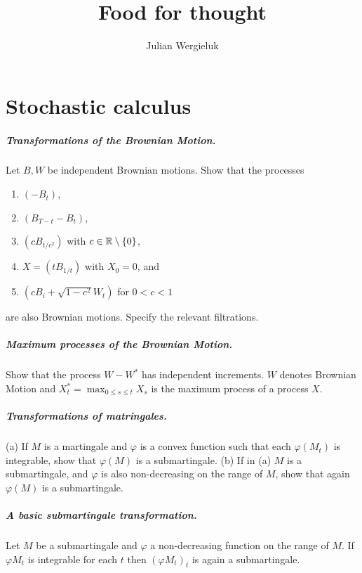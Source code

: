 \documentclass[11pt,oldfontcommands,oneside,onecolumn]{memoir}
\title{Food for thought}\author{Julian Wergieluk}\date{}
\begin{document}
\frontmatter
\maketitle
\newpage\tableofcontents

\mainmatter




\chapter{Stochastic calculus}

\paragraph{Transformations of the Brownian Motion. } Let $B,W$ be independent Brownian motions.
Show that the processes
\begin{enumerate}
    \item $\left( -B_t \right)$,
    \item $\left( B_{T-t}-B_t \right)$,
    \item $\left( c B_{t/c^2} \right)$ with $c\in\mathbb R \setminus \left\{ 0 \right\}$,
    \item $X= \left( tB_{1/t} \right)$ with $X_0=0$, and
    \item $\left( cB_i + \sqrt{1-c^2}W_t \right)$ for $0<c<1$
\end{enumerate}
are also Brownian motions. Specify the relevant filtrations.


\paragraph{Maximum processes of the Brownian Motion. } 
Show that the process $W - W^*$ has independent increments. $W$ denotes
Brownian Motion and $X^*_t= \max_{0 \leq s \leq t} X_s$ is the maximum process of 
a \cadlag process $X$.


\paragraph{Transformations of matringales.} (a) If $M$ is a martingale and
$\varphi$ is a convex function such that each $\varphi(M_t)$ is integrable,
show that $\varphi(M)$ is a submartingale.  (b) If in (a) $M$ is a
submartingale, and $\varphi$ is also non-decreasing on the range of $M$, show
that again $\varphi(M)$ is a submartingale.


\paragraph{A basic submartingale transformation.}
Let $M$ be a submartingale and $\varphi$ a non-decreasing function
on the range of $M$. If $\varphi M_t$ is integrable for each $t$ then 
$\left( \varphi M_t \right)_t$ is again a submartingale.
\end{document}
